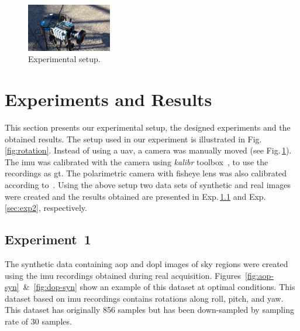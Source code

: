 \graphicspath{{./content/experiments/figures/}}

\begin{figure}
  \centering
\includegraphics[width=0.33\textwidth]{./content/experiments/figures/setup.jpg}
\caption{Experimental setup.}
\label{fig:setup}
\end{figure}


\section{Experiments and Results}
\label{sec:exp-res}

This section presents our experimental setup, the designed experiments and the
obtained results. The setup used in our experiment is illustrated in
Fig.\,\ref{fig:rotation}. Instead of using a \gls{uav}, a camera was manually
moved (see Fig.\,\ref{fig:setup}). The \gls{imu} was calibrated with the camera
using \emph{kalibr} toolbox~\cite{furgale2013unified, furgale2012continuous},
to use the recordings as \gls{gt}. The polarimetric camera with fisheye lens
was also calibrated according to~\cite{kannala2006generic}.
Using the above setup two data sets of synthetic and real images were created
and the results obtained are presented in Exp.\,\ref{sec:exp1} and
Exp.\,\ref{sec:exp2}, respectively.

\subsection{Experiment~1}
\label{sec:exp1}
The synthetic data containing \gls{aop} and \gls{dopl} images of sky regions
were created using the \gls{imu} recordings obtained during real acquisition.
Figures~\ref{fig:aop-syn}~\&~\ref{fig:dop-syn} show an example of this dataset
at optimal conditions. This dataset based on \gls{imu} recordings contains
rotations along roll, pitch, and yaw. This dataset has originally 856 samples
but has been down-sampled by sampling rate of 30 samples.

